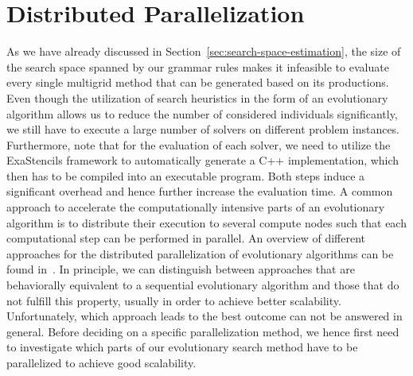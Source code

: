 \section{Distributed Parallelization}
\label{sec:distributed-parallelization}
As we have already discussed in Section~\ref{sec:search-space-estimation}, the size of the search space spanned by our grammar rules makes it infeasible to evaluate every single multigrid method that can be generated based on its productions.
Even though the utilization of search heuristics in the form of an evolutionary algorithm allows us to reduce the number of considered individuals significantly, we still have to execute a large number of solvers on different problem instances.
Furthermore, note that for the evaluation of each solver, we need to utilize the ExaStencils framework to automatically generate a C++ implementation, which then has to be compiled into an executable program.
Both steps induce a significant overhead and hence further increase the evaluation time.
A common approach to accelerate the computationally intensive parts of an evolutionary algorithm is to distribute their execution to several compute nodes such that each computational step can be performed in parallel.
An overview of different approaches for the distributed parallelization of evolutionary algorithms can be found in~\cite{gong2015distributed}.
In principle, we can distinguish between approaches that are behaviorally equivalent to a sequential evolutionary algorithm and those that do not fulfill this property, usually in order to achieve better scalability.
Unfortunately, which approach leads to the best outcome can not be answered in general.
Before deciding on a specific parallelization method, we hence first need to investigate which parts of our evolutionary search method have to be parallelized to achieve good scalability.

